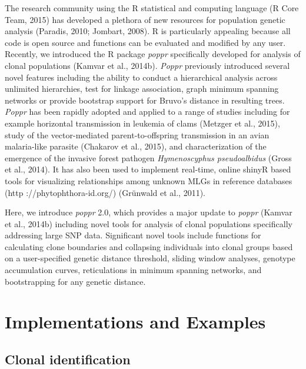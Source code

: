 \documentclass{frontiersSCNS} %
\begin{document}
The research community using the R statistical and computing language (R
Core Team, 2015) has developed a plethora of new resources for
population genetic analysis (Paradis, 2010; Jombart, 2008). R is
particularly appealing because all code is open source and functions can
be evaluated and modified by any user. Recently, we introduced the R
package \emph{poppr} specifically developed for analysis of clonal
populations (Kamvar et al., 2014b). \emph{Poppr} previously introduced
several novel features including the ability to conduct a hierarchical
analysis across unlimited hierarchies, test for linkage association,
graph minimum spanning networks or provide bootstrap support for Bruvo's
distance in resulting trees. \emph{Poppr} has been rapidly adopted and
applied to a range of studies including for example horizontal
transmission in leukemia of clams (Metzger et al., 2015), study of the
vector-mediated parent-to-offspring transmission in an avian
malaria-like parasite (Chakarov et al., 2015), and characterization of
the emergence of the invasive forest pathogen \emph{Hymenoscyphus
pseudoalbidus} (Gross et al., 2014). It has also been used to implement
real-time, online shinyR based tools for visualizing relationships among
unknown MLGs in reference databases (http ://phytophthora-id.org/)
(Gr{\"{u}}nwald et al., 2011).

Here, we introduce \emph{poppr} 2.0, which provides a major update to
\emph{poppr} (Kamvar et al., 2014b) including novel tools for analysis
of clonal populations specifically addressing large SNP data.
Significant novel tools include functions for calculating clone
boundaries and collapsing individuals into clonal groups based on a
user-specified genetic distance threshold, sliding window analyses,
genotype accumulation curves, reticulations in minimum spanning
networks, and bootstrapping for any genetic distance.

\section*{Implementations and
Examples}\label{implementations-and-examples}

\subsection*{Clonal identification}\label{clonal-identification}
\end{document}

